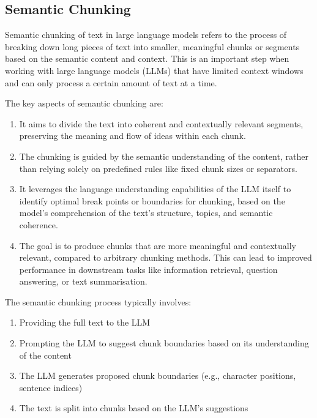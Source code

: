 \documentclass[
  letterpaper,
  DIV=11,
  numbers=noendperiod]{scrartcl}
\providecommand{\tightlist}{%
  \setlength{\itemsep}{0pt}\setlength{\parskip}{0pt}}\usepackage{longtable,booktabs,array}
\begin{document}
\subsection{Semantic Chunking}\label{semantic-chunking}

Semantic chunking of text in large language models refers to the process
of breaking down long pieces of text into smaller, meaningful chunks or
segments based on the semantic content and context. This is an important
step when working with large language models (LLMs) that have limited
context windows and can only process a certain amount of text at a time.

The key aspects of semantic chunking are:

\begin{enumerate}
\def\labelenumi{\arabic{enumi}.}
\item
  It aims to divide the text into coherent and contextually relevant
  segments, preserving the meaning and flow of ideas within each chunk.
\item
  The chunking is guided by the semantic understanding of the content,
  rather than relying solely on predefined rules like fixed chunk sizes
  or separators.
\item
  It leverages the language understanding capabilities of the LLM itself
  to identify optimal break points or boundaries for chunking, based on
  the model's comprehension of the text's structure, topics, and
  semantic coherence.
\item
  The goal is to produce chunks that are more meaningful and
  contextually relevant, compared to arbitrary chunking methods. This
  can lead to improved performance in downstream tasks like information
  retrieval, question answering, or text summarisation.
\end{enumerate}

The semantic chunking process typically involves:

\begin{enumerate}
\def\labelenumi{\arabic{enumi}.}
\tightlist
\item
  Providing the full text to the LLM
\item
  Prompting the LLM to suggest chunk boundaries based on its
  understanding of the content
\item
  The LLM generates proposed chunk boundaries (e.g., character
  positions, sentence indices)
\item
  The text is split into chunks based on the LLM's suggestions
\end{enumerate}
\end{document}
